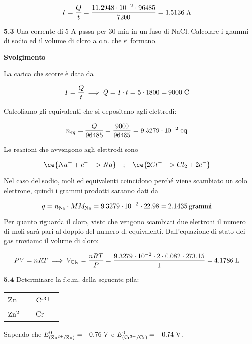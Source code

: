 $$I=\frac{Q}{t}
=\frac{11.2948 \cdot 10^{-2} \cdot 96485}{7200}=1.5136 \; \rm A$$

\vspace{0.2cm}\textbf{5.3} Una corrente di 5 A passa per 30 min in un fuso di NaCl. Calcolare i grammi di sodio ed il
volume di cloro a c.n. che si formano.

\vspace{0.2cm}\large\textbf{Svolgimento}\normalsize

\vspace{0.2cm}La carica che scorre è data da

$$I=\frac{Q}{t}
\implies
Q=I \cdot t
=5 \cdot 1800=9000 \; \rm C$$

Calcoliamo gli equivalenti che si depositano agli elettrodi:

$$n_{eq}=\frac{Q}{96485}=\frac{9000}{96485}=9.3279 \cdot 10^{-2} \; \rm eq$$

Le reazioni che avvengono agli elettrodi sono

$$\ce{Na^+ + e^- -> Na}
\quad;\quad
\ce{2Cl^- -> Cl_2 + 2e^-}$$

Nel caso del sodio, moli ed equivalenti coincidono perché viene scambiato un solo elettrone, quindi i grammi prodotti saranno dati da

$$g=n_{\rm Na} \cdot MM_{\rm Na}
=9.3279 \cdot 10^{-2} \cdot 22.98=2.1435 \; \rm grammi$$

Per quanto riguarda il cloro, visto che vengono scambiati due elettroni il numero di moli sarà pari al doppio del numero di equivalenti. Dall'equazione di stato dei gas troviamo il volume di cloro:

$$PV=nRT
\implies
V_{\rm Cl_2}=\frac{nRT}{P}
=\frac{9.3279 \cdot 10^{-2} \cdot 2 \cdot 0.082 \cdot 273.15}{1}= 4.1786 \; \rm L$$

\vspace{0.2cm}\textbf{5.4} Determinare la f.e.m. della seguente pila:

\begin{center}
    \begin{tabular}{|p{3.7cm}||p{3.7cm}|}
         Zn & $\rm Cr^{3+}$ \, \\[0.5ex]
         $\rm Zn^{2+}$ \,  & Cr\\[0.5ex]
    \end{tabular}
\end{center}

Sapendo che $E^{0}_{(\rm Zn^{2+}/Zn)}=-0.76 \; \rm V$ e $E^{0}_{(\rm Cr^{3+}/Cr)}=-0.74 \; \rm V$.

